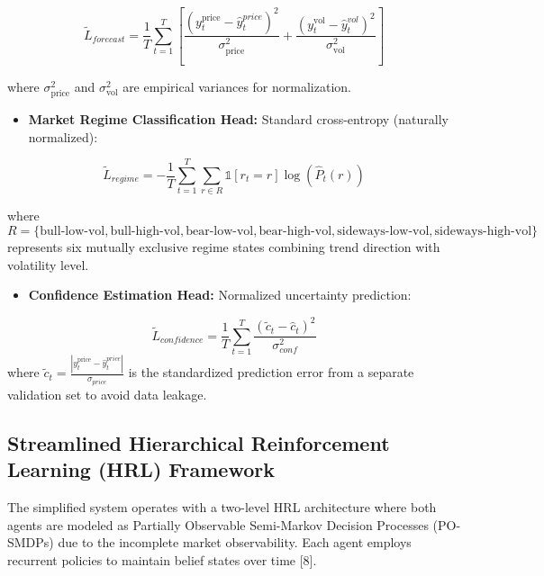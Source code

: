 \documentclass[11pt,a4paper]{article}
\begin{document}
\begin{equation}
    \tilde{L}_{forecast} = \frac{1}{T} \sum_{t=1}^{T} \left[\frac{(y_t^{\text{price}} - \hat{y}_t^{price})^2}{\sigma_{\text{price}}^2} + \frac{(y_t^{\text{vol}} - \hat{y}_t^{vol})^2}{\sigma_{\text{vol}}^2}\right]
\end{equation}

    where $\sigma_{\text{price}}^2$ and $\sigma_{\text{vol}}^2$ are empirical variances for normalization.

\begin{itemize}
\item   \textbf{Market Regime Classification Head:} Standard cross-entropy (naturally normalized):
\end{itemize}
   \1

\begin{equation}
    \tilde{L}_{regime} = -\frac{1}{T} \sum_{t=1}^{T} \sum_{r \in R} \mathbb{1}[r_t = r] \log(\hat{P}_t(r))
\end{equation}

    where $R = \{\text{bull-low-vol}, \text{bull-high-vol}, \text{bear-low-vol}, \text{bear-high-vol}, \text{sideways-low-vol}, \text{sideways-high-vol}\}$ represents six mutually exclusive regime states combining trend direction with volatility level.

\begin{itemize}
\item   \textbf{Confidence Estimation Head:} Normalized uncertainty prediction:
\end{itemize}
\begin{equation}
\tilde{L}_{confidence} = \frac{1}{T} \sum_{t=1}^{T} \frac{(\tilde{c}_t - \hat{c}_t)^2}{\sigma_{conf}^2}
\end{equation}
    where $\tilde{c}_t = \frac{|y_t^{\text{price}} - \hat{y}_t^{price}|}{\sigma_{price}}$ is the standardized prediction error from a separate validation set to avoid data leakage.

\subsection{Streamlined Hierarchical Reinforcement Learning (HRL) Framework}

The simplified system operates with a two-level HRL architecture where both agents are modeled as Partially Observable Semi-Markov Decision Processes (PO-SMDPs) due to the incomplete market observability. Each agent employs recurrent policies to maintain belief states over time [8].
\end{document}

